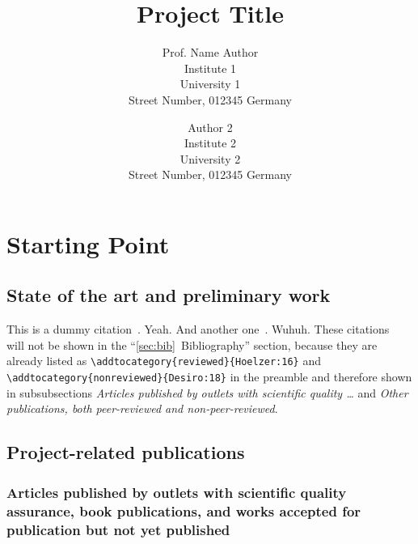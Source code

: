 \documentclass[american,firsttime]{dfgproposal}
\title{Project Title}
\author[%
	Prof. Name Author\\
	Institute 1, University 1 (Abbr)
	\and
	Author 2\\
	Institute 2, University 2 (Abbr2)
]{Prof. Name Author\\
	Institute 1\\University 1\\Street Number, 012345 Germany
	\and
	Author 2\\
	Institute 2\\University 2\\Street Number, 012345 Germany
}
\begin{document}
	\maketitle
	
	\section{Starting Point}
	\label{sec:work-report}
	
	\subsection{State of the art and preliminary work}
	This is a dummy citation~\cite{Hoelzer:17}. Yeah. And another
	one~\cite{Gerst:18}. Wuhuh. These citations~\cite{Hoelzer:16, Desiro:18} will
	not be shown in the \enquote{\ref{sec:bib}~Bibliography} section, because they are
	already listed as \verb=\addtocategory{reviewed}{Hoelzer:16}= and
	\verb=\addtocategory{nonreviewed}{Desiro:18}= in the preamble and therefore
	shown in subsubsections \emph{Articles published by outlets with scientific
		quality \dots} and \emph{Other publications, both peer-reviewed and non-peer-reviewed}. 
	
	\blindtext[1]
	
	\subsection{Project-related publications}
	
	\newrefcontext%
	\subsubsection{Articles published by outlets with scientific quality assurance, book publications, and works accepted for publication but not yet published}
	\printbibliography[category=reviewed, heading=none, env=bibliographyNUM, resetnumbers]
	
\end{document}
